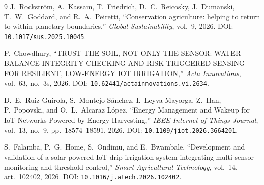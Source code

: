 \documentclass[11pt,a4paper]{article}
\begin{document}
\begin{thebibliography}{9}
J.~Rockstr\"om, A.~Kassam, T.~Friedrich, D.~C.~Reicosky, J.~Dumanski, T.~W.~Goddard, and R.~A.~Peiretti, ``Conservation agriculture: helping to return to within planetary boundaries,'' \emph{Global Sustainability}, vol.~9, 2026. DOI: \texttt{10.1017/sus.2025.10045}.

P.~Chowdhury, ``TRUST THE SOIL, NOT ONLY THE SENSOR: WATER-BALANCE INTEGRITY CHECKING AND RISK-TRIGGERED SENSING FOR RESILIENT, LOW-ENERGY IOT IRRIGATION,'' \emph{Acta Innovations}, vol.~63, no.~3s, 2026. DOI: \texttt{10.62441/actainnovations.vi.2634}.

D.~E.~Ruiz-Guirola, S.~Montejo-S\'anchez, I.~Leyva-Mayorga, Z.~Han, P.~Popovski, and O.~L.~Alcaraz L{\'o}pez, ``Energy Management and Wakeup for IoT Networks Powered by Energy Harvesting,'' \emph{IEEE Internet of Things Journal}, vol.~13, no.~9, pp.~18574--18591, 2026. DOI: \texttt{10.1109/jiot.2026.3664201}.

S.~Falamba, P.~G.~Home, S.~Ondimu, and E.~Bwambale, ``Development and validation of a solar-powered IoT drip irrigation system integrating multi-sensor monitoring and threshold control,'' \emph{Smart Agricultural Technology}, vol.~14, art.~102402, 2026. DOI: \texttt{10.1016/j.atech.2026.102402}.

\end{thebibliography}
\end{document}
